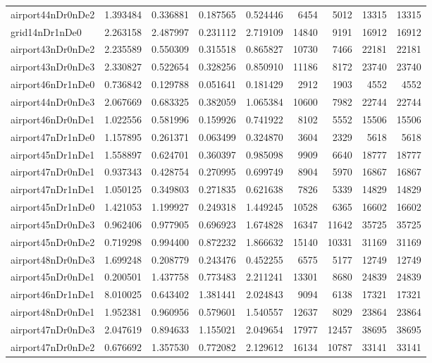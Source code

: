 \begin{longtable}{|l|r|r|r|r|r|r|r|r|}
airport44nDr0nDe2 & 1.393484 & 0.336881 & 0.187565 & 0.524446 & 6454 & 5012 & 13315 & 13315 \\
grid14nDr1nDe0 & 2.263158 & 2.487997 & 0.231112 & 2.719109 & 14840 & 9191 & 16912 & 16912 \\
airport43nDr0nDe2 & 2.235589 & 0.550309 & 0.315518 & 0.865827 & 10730 & 7466 & 22181 & 22181 \\
airport43nDr0nDe3 & 2.330827 & 0.522654 & 0.328256 & 0.850910 & 11186 & 8172 & 23740 & 23740 \\
airport46nDr1nDe0 & 0.736842 & 0.129788 & 0.051641 & 0.181429 & 2912 & 1903 & 4552 & 4552 \\
airport44nDr0nDe3 & 2.067669 & 0.683325 & 0.382059 & 1.065384 & 10600 & 7982 & 22744 & 22744 \\
airport46nDr0nDe1 & 1.022556 & 0.581996 & 0.159926 & 0.741922 & 8102 & 5552 & 15506 & 15506 \\
airport47nDr1nDe0 & 1.157895 & 0.261371 & 0.063499 & 0.324870 & 3604 & 2329 & 5618 & 5618 \\
airport45nDr1nDe1 & 1.558897 & 0.624701 & 0.360397 & 0.985098 & 9909 & 6640 & 18777 & 18777 \\
airport47nDr0nDe1 & 0.937343 & 0.428754 & 0.270995 & 0.699749 & 8904 & 5970 & 16867 & 16867 \\
airport47nDr1nDe1 & 1.050125 & 0.349803 & 0.271835 & 0.621638 & 7826 & 5339 & 14829 & 14829 \\
airport45nDr1nDe0 & 1.421053 & 1.199927 & 0.249318 & 1.449245 & 10528 & 6365 & 16602 & 16602 \\
airport45nDr0nDe3 & 0.962406 & 0.977905 & 0.696923 & 1.674828 & 16347 & 11642 & 35725 & 35725 \\
airport45nDr0nDe2 & 0.719298 & 0.994400 & 0.872232 & 1.866632 & 15140 & 10331 & 31169 & 31169 \\
airport48nDr0nDe3 & 1.699248 & 0.208779 & 0.243476 & 0.452255 & 6575 & 5177 & 12749 & 12749 \\
airport45nDr0nDe1 & 0.200501 & 1.437758 & 0.773483 & 2.211241 & 13301 & 8680 & 24839 & 24839 \\
airport46nDr1nDe1 & 8.010025 & 0.643402 & 1.381441 & 2.024843 & 9094 & 6138 & 17321 & 17321 \\
airport48nDr0nDe1 & 1.952381 & 0.960956 & 0.579601 & 1.540557 & 12637 & 8029 & 23864 & 23864 \\
airport47nDr0nDe3 & 2.047619 & 0.894633 & 1.155021 & 2.049654 & 17977 & 12457 & 38695 & 38695 \\
airport47nDr0nDe2 & 0.676692 & 1.357530 & 0.772082 & 2.129612 & 16134 & 10787 & 33141 & 33141 \\

\end{longtable}
